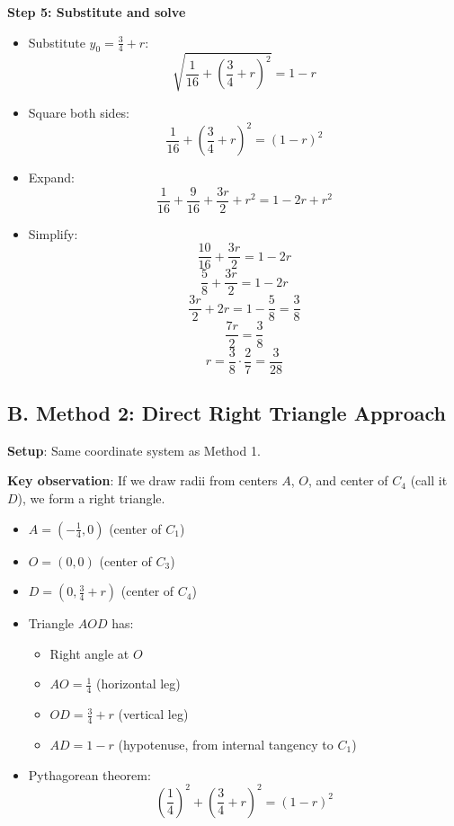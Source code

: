 \documentclass[11pt]{article}
\begin{document}
\begin{conversionbox}
\textbf{Step 5: Substitute and solve}
\begin{itemize}
    \item Substitute $y_0 = \frac{3}{4} + r$:
    \[\sqrt{\frac{1}{16} + (\frac{3}{4} + r)^2} = 1 - r\]
    
    \item Square both sides:
    \[\frac{1}{16} + (\frac{3}{4} + r)^2 = (1-r)^2\]
    
    \item Expand:
    \[\frac{1}{16} + \frac{9}{16} + \frac{3r}{2} + r^2 = 1 - 2r + r^2\]
    
    \item Simplify:
    \[\frac{10}{16} + \frac{3r}{2} = 1 - 2r\]
    \[\frac{5}{8} + \frac{3r}{2} = 1 - 2r\]
    \[\frac{3r}{2} + 2r = 1 - \frac{5}{8} = \frac{3}{8}\]
    \[\frac{7r}{2} = \frac{3}{8}\]
    \[r = \frac{3}{8} \cdot \frac{2}{7} = \frac{3}{28}\]
\end{itemize}

\subsection*{B. Method 2: Direct Right Triangle Approach}

\textbf{Setup}: Same coordinate system as Method 1.

\textbf{Key observation}: If we draw radii from centers $A$, $O$, and center of $C_4$ (call it $D$), we form a right triangle.

\begin{itemize}
    \item $A = (-\frac{1}{4}, 0)$ (center of $C_1$)
    \item $O = (0, 0)$ (center of $C_3$)
    \item $D = (0, \frac{3}{4} + r)$ (center of $C_4$)
    
    \item Triangle $AOD$ has:
    \begin{itemize}
        \item Right angle at $O$
        \item $AO = \frac{1}{4}$ (horizontal leg)
        \item $OD = \frac{3}{4} + r$ (vertical leg)
        \item $AD = 1 - r$ (hypotenuse, from internal tangency to $C_1$)
    \end{itemize}
    
    \item Pythagorean theorem:
    \[\left(\frac{1}{4}\right)^2 + \left(\frac{3}{4} + r\right)^2 = (1-r)^2\]
\end{itemize}


\end{conversionbox}
\end{document}
